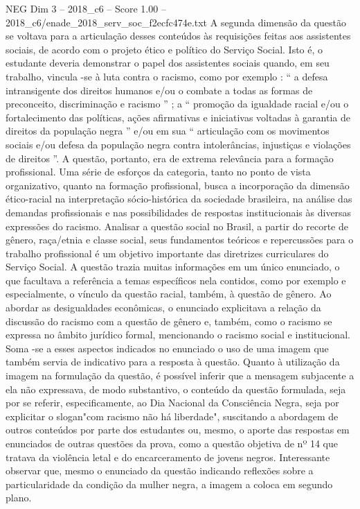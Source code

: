 \begin{textsample}{NEG Dim 3 – 2018\_c6 – Score 1.00 – 2018\_c6/enade\_2018\_serv\_soc\_f2ecfc474e.txt}
A segunda dimensão da questão se voltava para a articulação desses conteúdos às requisições feitas aos assistentes sociais, de acordo com o projeto ético e político do Serviço Social.
Isto é, o estudante deveria demonstrar o papel dos assistentes sociais quando, em seu trabalho, vincula -se à luta contra o racismo, como por exemplo : “ a defesa intransigente dos direitos humanos e/ou o combate a todas as formas de preconceito, discriminação e racismo ” ; a “ promoção da igualdade racial e/ou o fortalecimento das políticas, ações afirmativas e iniciativas voltadas à garantia de direitos da população negra ” e/ou em sua “ articulação com os movimentos sociais e/ou defesa da população negra contra intolerâncias, injustiças e violações de direitos ”.
A questão, portanto, era de extrema relevância para a formação profissional.
Uma série de esforços da categoria, tanto no ponto de vista organizativo, quanto na formação profissional, busca a incorporação da dimensão ético-racial na interpretação sócio-histórica da sociedade brasileira, na análise das demandas profissionais e nas possibilidades de respostas institucionais às diversas expressões do racismo.
Analisar a questão social no Brasil, a partir do recorte de gênero, raça/etnia e classe social, seus fundamentos teóricos e repercussões para o trabalho profissional é um objetivo importante das diretrizes curriculares do Serviço Social.
A questão trazia muitas informações em um único enunciado, o que facultava a referência a temas específicos nela contidos, como por exemplo e especialmente, o vínculo da questão racial, também, à questão de gênero.
Ao abordar as desigualdades econômicas, o enunciado explicitava a relação da discussão do racismo com a questão de gênero e, também, como o racismo se expressa no âmbito jurídico formal, mencionando o racismo social e institucional.
Soma -se a esses aspectos indicados no enunciado o uso de uma imagem que também servia de indicativo para a resposta à questão.
Quanto à utilização da imagem na formulação da questão, é possível inferir que a mensagem subjacente a ela não expressava, de modo substantivo, o conteúdo da questão formulada, seja por se referir, especificamente, ao Dia Nacional da Consciência Negra, seja por explicitar o slogan"com racismo não há liberdade", suscitando a abordagem de outros conteúdos por parte dos estudantes ou, mesmo, o aporte das respostas em enunciados de outras questões da prova, como a questão objetiva de nº 14 que tratava da violência letal e do encarceramento de jovens negros.
Interessante observar que, mesmo o enunciado da questão indicando reflexões sobre a particularidade da condição da mulher negra, a imagem a coloca em segundo plano.

\end{textsample}
